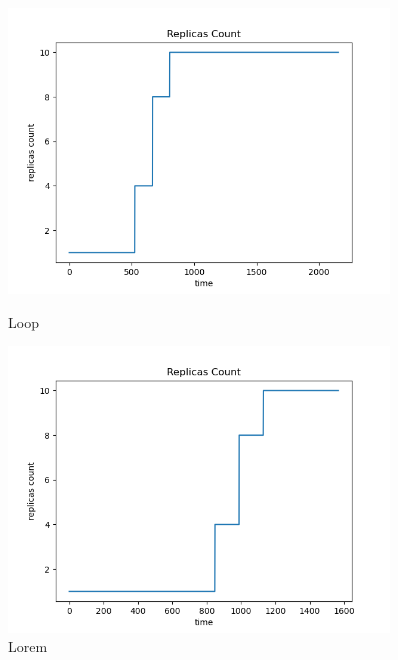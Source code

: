 \begin{figure}[h]
    \begin{minipage}[t]{0.5\textwidth}
        \centering
        \includegraphics[width=0.9\textwidth]{../sample_results/loop/hpa/replicas-count-hpa.png}
        \caption{Loop}
    \end{minipage}
    \hfill
    \begin{minipage}[t]{0.5\textwidth}
        \centering
        \includegraphics[width=0.9\textwidth]{../sample_results/lorem/hpa/replicas-count-hpa.png}
        \caption{Lorem}
    \end{minipage}
\end{figure}

